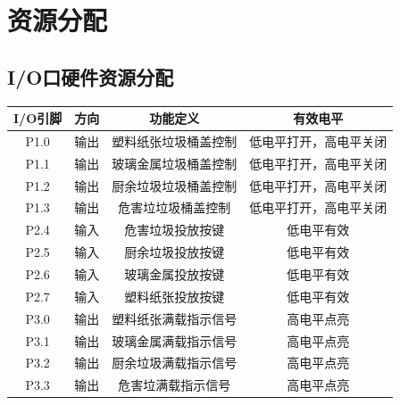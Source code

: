 \documentclass[12pt,a4paper]{article}
\begin{document}
\section{资源分配}
\subsection{I/O口硬件资源分配}
\begin{table}[H]
    \centering
    \small
    \begin{tabular}{|c|c|c|c|}
        \hline
        I/O引脚 & 方向 & 功能定义 & 有效电平 \\
        \hline
        P1.0 & 输出 & 塑料纸张垃圾桶盖控制 & 低电平打开，高电平关闭 \\
        \hline
        P1.1 & 输出 & 玻璃金属垃圾桶盖控制 & 低电平打开，高电平关闭 \\
        \hline
        P1.2 & 输出 & 厨余垃圾垃圾桶盖控制 & 低电平打开，高电平关闭 \\
        \hline
        P1.3 & 输出 & 危害垃垃圾桶盖控制 & 低电平打开，高电平关闭 \\
        \hline
        P2.4 & 输入 & 危害垃圾投放按键 & 低电平有效 \\
        \hline
        P2.5 & 输入 & 厨余垃圾投放按键 & 低电平有效 \\
        \hline
        P2.6 & 输入 & 玻璃金属投放按键 & 低电平有效 \\
        \hline
        P2.7 & 输入 & 塑料纸张投放按键 & 低电平有效 \\
        \hline
        P3.0 & 输出 & 塑料纸张满载指示信号 & 高电平点亮 \\
        \hline
        P3.1 & 输出 & 玻璃金属满载指示信号 & 高电平点亮 \\
        \hline
        P3.2 & 输出 & 厨余垃圾满载指示信号 & 高电平点亮 \\
        \hline
        P3.3 & 输出 & 危害垃满载指示信号 & 高电平点亮 \\
        \hline
    \end{tabular}
\end{table}
\end{document}

